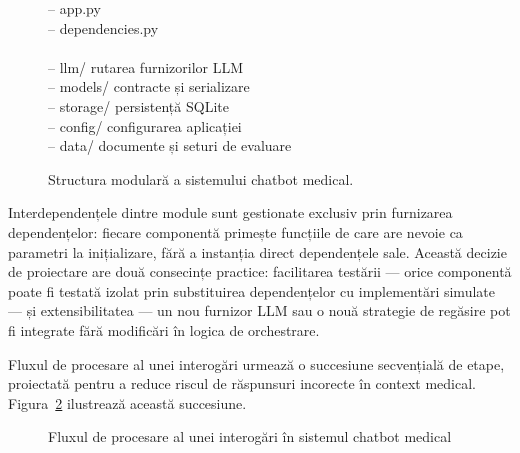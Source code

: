 \documentclass[12pt, a4paper, oneside, romanian]{teza-upb}
\begin{document}
\begin{figure}[H]
{\begin{minipage}{0.90\textwidth}
\textbar\quad \textbar-- app.py\\
\textbar\quad \textbar-- dependencies.py\\
\textbar\\
\textbar-- llm/ \hfill rutarea furnizorilor LLM\\
\textbar-- models/ \hfill contracte și serializare\\
\textbar-- storage/ \hfill persistență SQLite\\
\textbar-- config/ \hfill configurarea aplicației\\
\textbar-- data/ \hfill documente și seturi de evaluare
\end{minipage}
}
\caption{Structura modulară a sistemului chatbot medical.}
\label{fig:structura_modulara_proiect}
\end{figure}

Interdependențele dintre module sunt gestionate exclusiv prin furnizarea dependențelor: fiecare componentă primește funcțiile de care are nevoie ca parametri la inițializare, fără a instanția direct dependențele sale. Această decizie de proiectare are două consecințe practice: facilitarea testării — orice componentă poate fi testată izolat prin substituirea dependențelor cu implementări simulate — și extensibilitatea — un nou furnizor LLM sau o nouă strategie de regăsire pot fi integrate fără modificări în logica de orchestrare.

Fluxul de procesare al unei interogări urmează o succesiune secvențială de etape, proiectată pentru a reduce riscul de răspunsuri incorecte în context medical. Figura~\ref{fig:pipeline} ilustrează această succesiune.

\begin{figure}[H]
\centering
{}
\caption{Fluxul de procesare al unei interogări în sistemul chatbot medical}
\label{fig:pipeline}
\end{figure}
\end{document}
